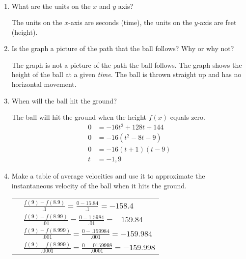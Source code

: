 \documentclass[nooutcomes]{ximera}
\begin{document}
\begin{problem}
\begin{problem}
\[\begin{array}{lr}
\end{array} \]



	
		\begin{enumerate}
			
		 \item  What are the units on the $x$ and $y$ axis?
		 \begin{freeResponse}		 
		The units on the $x$-axis are seconds (time), the units on the $y$-axis are feet (height).
		\end{freeResponse}
			
		\item  Is the graph a picture of the path that the ball follows?  Why or why not?
		\begin{freeResponse}		 
		 The graph is not a picture of the path the ball follows.  The graph shows the height of the ball at a given \emph{time}.  The ball is thrown straight up and has no horizontal movement.
		\end{freeResponse}
	
		\item  When will the ball hit the ground?
		\begin{freeResponse}		 
		The ball will hit the ground when the height $f(x)$ equals zero.
			\begin{align*}
			0&=-16t^2+128t+144 \\
			0&=-16(t^2-8t-9) \\
 			0&=-16(t+1)(t-9) \\
 			t&=-1,9 
 			\end{align*}
		\end{freeResponse}
		
		
	
		\item  Make a table of average velocities and use it to approximate the instantaneous velocity of the ball when it hits the ground.
		\begin{freeResponse}		 
			\begin{tabular}{|l|l|}
			\hline
			\text{Time Interval} & \text{Average Velocity}  \\
			\hline
			[8.9, 9] & $\frac{f(9)-f(8.9)}{.1}=\frac{0-15.84}{.1}=-158.4$  \\
			\hline
			[8.99,9] & $\frac{f(9)-f(8.99)}{.01}=\frac{0-1.5984}{.01}=-159.84$  \\
			\hline
			[8.999, 9] & $\frac{f(9)-f(8.999)}{.001}=\frac{0-.159984}{.001}=-159.984$  \\
			\hline
			[8.9999, 9] &  $\frac{f(9)-f(8.999)}{.0001}=\frac{0-.0159998}{.0001}=-159.998$  \\
			\hline
			\end{tabular}
		\end{freeResponse}
		

\end{enumerate}
\end{problem}
\end{problem}
\end{document}
